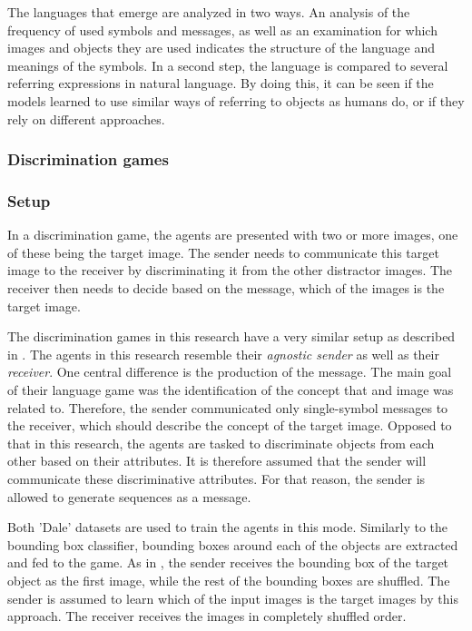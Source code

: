 The languages that emerge are analyzed in two ways.
An analysis of the frequency of used symbols and messages, as well as an examination for which images and objects they are used indicates the structure of the language and meanings of the symbols.
In a second step, the language is compared to several referring expressions in natural language.
By doing this, it can be seen if the models learned to use similar ways of referring to objects as humans do, or if they rely on different approaches.

\subsubsection{Discrimination games}
\subsubsection*{Setup}

In a discrimination game, the agents are presented with two or more images, one of these being the target image.
The sender needs to communicate this target image to the receiver by discriminating it from the other distractor images.
The receiver then needs to decide based on the message, which of the images is the target image.

The discrimination games in this research have a very similar setup as described in \citet{Lazaridou2017}.
The agents in this research resemble their \emph{agnostic sender} as well as their \emph{receiver}.
One central difference is the production of the message.
The main goal of their language game was the identification of the concept that and image was related to.
Therefore, the sender communicated only single-symbol messages to the receiver, which should describe the concept of the target image.
Opposed to that in this research, the agents are tasked to discriminate objects from each other based on their attributes.
It is therefore assumed that the sender will communicate these discriminative attributes.
For that reason, the sender is allowed to generate sequences as a message.

Both 'Dale' datasets are used to train the agents in this mode.
Similarly to the bounding box classifier, bounding boxes around each of the objects are extracted and fed to the game.
As in \citet{Lazaridou2017}, the sender receives the bounding box of the target object as the first image, while the rest of the bounding boxes are shuffled.
The sender is assumed to learn which of the input images is the target images by this approach.
The receiver receives the images in completely shuffled order.

